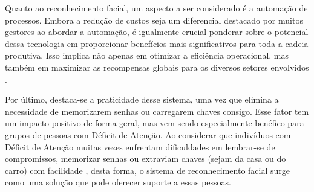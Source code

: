 Quanto ao reconhecimento facial, um aspecto a ser considerado é a automação 
de processos. Embora a redução de custos seja um diferencial destacado 
por muitos gestores ao abordar a automação, é igualmente crucial ponderar 
sobre o potencial dessa tecnologia em proporcionar benefícios mais 
significativos para toda a cadeia produtiva. Isso implica não apenas em 
otimizar a eficiência operacional, mas também em maximizar as 
recompensas globais para os diversos setores envolvidos \cite{tiinside2023}.

Por último, destaca-se a praticidade desse sistema, uma vez que 
elimina a necessidade de memorizarem senhas ou carregarem 
chaves consigo. Esse fator tem um impacto positivo de forma geral, 
mas vem sendo especialmente benéfico 
para grupos de pessoas com Déficit de Atenção. 
Ao considerar que indivíduos  com Déficit de Atenção muitas vezes enfrentam dificuldades 
em lembrar-se de compromissos, memorizar senhas ou extraviam chaves (sejam da casa ou do carro) 
com facilidade \cite{abda2023}, desta forma, o sistema de reconhecimento 
facial surge como uma solução que pode oferecer suporte a essas pessoas.
